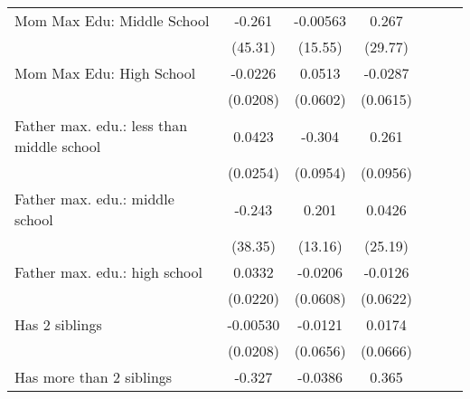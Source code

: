{\begin{tabular}{l*{6}{c}}
\addlinespace
Mom Max Edu: Middle School&      -0.261         &    -0.00563         &       0.267         &                     &                     &                     \\
                    &     (45.31)         &     (15.55)         &     (29.77)         &                     &                     &                     \\
\addlinespace
Mom Max Edu: High School&     -0.0226         &      0.0513         &     -0.0287         &                     &                     &                     \\
                    &    (0.0208)         &    (0.0602)         &    (0.0615)         &                     &                     &                     \\
\addlinespace
Father max. edu.: less than middle school&      0.0423         &      -0.304\sym{**} &       0.261\sym{**} &                     &                     &                     \\
                    &    (0.0254)         &    (0.0954)         &    (0.0956)         &                     &                     &                     \\
\addlinespace
Father max. edu.: middle school&      -0.243         &       0.201         &      0.0426         &                     &                     &                     \\
                    &     (38.35)         &     (13.16)         &     (25.19)         &                     &                     &                     \\
\addlinespace
Father max. edu.: high school&      0.0332         &     -0.0206         &     -0.0126         &                     &                     &                     \\
                    &    (0.0220)         &    (0.0608)         &    (0.0622)         &                     &                     &                     \\
\addlinespace
Has 2 siblings      &    -0.00530         &     -0.0121         &      0.0174         &                     &                     &                     \\
                    &    (0.0208)         &    (0.0656)         &    (0.0666)         &                     &                     &                     \\
\addlinespace
Has more than 2 siblings&      -0.327         &     -0.0386         &       0.365         &                     &                     &                     \\

\end{tabular}}
